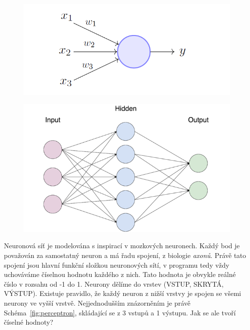 \documentclass[a4paper,12pt]{article}
\begin{document}
        \begin{figure}[h]
        \centering
        \begin{minipage}{.5\textwidth}
            \centering
            \includegraphics[width=1.1\linewidth]{data/perceptron-model1.png}
            \label{fig:perceptron}
        \end{minipage}%
        \begin{minipage}{.5\textwidth}
            \centering
            \includegraphics[width=1.1\linewidth]{data/easynn-scheme.png}
            \label{fig:easynn}
        \end{minipage}
        \end{figure}

        Neuronová síť je modelována s inspirací v mozkových neuronech. Každý bod je považován za
        samostatný neuron a má řadu spojení, z biologie \textit{axonů}. Právě tato spojení jsou hlavní
        funkční složkou neuronových sítí, v programu tedy vždy uchováváme číselnou hodnotu každého z nich. 
        Tato hodnota je obvykle reálné číslo v rozsahu od -1 do 1.
        Neurony dělíme do vrstev (VSTUP, SKRYTÁ, VÝSTUP). Existuje pravidlo, že každý neuron z nižší vrstvy 
        je spojen se všemi neurony ve vyšší vrstvě. Nejjednodušším znázorněním je 
        právě Schéma~\ref{fig:perceptron}, skládající se z 3 vstupů a 1 výstupu.
        Jak se ale tvoří číselné hodnoty?
\end{document}
